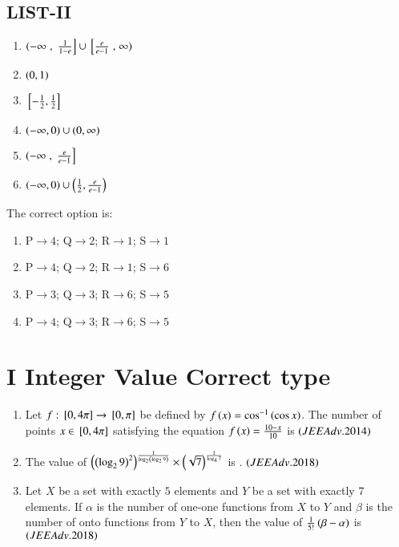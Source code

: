 \documentclass[journal,12pt,onecolumn,article]{IEEEtran}
\theoremstyle{remark}
\begin{document}
\begin{enumerate}
\begin{multicols}{2}
	\section*{LIST-II}
\begin{enumerate}
	\item $\left(-\infty\right.,{}\left.\frac{1}{1-e}\right]\cup{}\left[\frac{e}{e-1}\right.,\left.\infty\right)$
	\item $\left(0,1\right)$
	\item ${}\left[-\frac{1}{2},\frac{1}{2}\right]$
	\item $\left(-\infty,0\right)\cup\left(0,\infty\right)$
	\item $\left(-\infty\right.,{}\left.\frac{e}{e-1}\right]$
	\item $\left(-\infty,0\right)\cup\left(\frac{1}{2},\frac{e}{e-1}\right)$
\end{enumerate}
\end{multicols}
The correct option is:
\begin{multicols}{2}
		\begin{enumerate}
		\item P$\to4$; Q$\to2$; R$\to1$; S$\to1$
		\item P$\to4$; Q$\to2$; R$\to1$; S$\to6$
	\columnbreak
		\item P$\to3$; Q$\to3$; R$\to6$; S$\to5$
		\item P$\to4$; Q$\to3$; R$\to6$; S$\to5$
	\end{enumerate}
\end{multicols}
\end{enumerate}
	    \section*{I Integer Value Correct type}
		   \begin{enumerate}
			   \item Let $f:{}\left[0,4\pi\right]\to{}\left[0,\pi\right]$ be defined by $f\left(x\right)=\cos^{-1}\left(\cos x\right)$. The number of points $x\in{}\left[0,4\pi\right]$ satisfying the equation  ${f\left(x\right)=\frac{10-x}{10}}$ is \hfill{$\left(JEE Adv.2014\right)$}
			   \item The  value  of $\left(\left(\log_29\right)^2\right)^{\frac{1}{\log_2\left(\log_29\right)}}\times \left(\sqrt7\right)^{\frac{1}{\log_47}}$ is .
				   \hfill${\left(JEEAdv.2018\right)}$
			   \item Let $X$ be a set with exactly $5$ elements and $Y$ be a set with exactly $7$ elements. If $\alpha$ is the number of one-one functions from $X$ to $Y$ and $\beta$ is the number of onto functions from $Y$ to $X$, then the value of $\frac{1}{5!}\left(\beta-\alpha\right)$ is \hfill{${\left(JEEAdv.2018\right)}$}
		   \end{enumerate}
\end{document}
